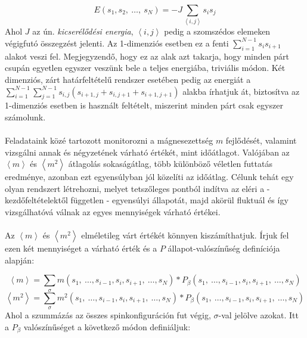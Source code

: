 \begin{equation} \label{eq:2}
    E \left( s_{1}, s_{2},\ \dots,\ s_{N} \right)
    =
    - J \sum_{\left< i,j \right>} s_{i} s_{j}
\end{equation}
Ahol $J$ az ún. \emph{kicserélődési energia}, ${\left< i,j \right>}$ pedig a szomszédos elemeken végigfutó összegzést jelenti. Az 1-dimenziós esetben ez a fenti $\sum_{i=1}^{N-1} s_{i} s_{i+1}$ alakot veszi fel. Megjegyzendő, hogy ez az alak azt takarja, hogy minden párt csupán egyetlen egyszer veszünk bele a teljes energiába, triviális módon. Két dimenziós, zárt határfeltételű rendszer esetében pedig az energiát a $\sum_{i=1}^{N-1}\sum_{j=1}^{N-1} s_{i,j} \left( s_{i+1,j} + s_{i,j+1} + s_{i+1,j+1} \right)$ alakba írhatjuk át, biztosítva az 1-dimenziós esetben is használt feltételt, miszerint minden párt csak egyszer számolunk.
\\ \\
Feladataink közé tartozott monitorozni a mágnesezettség $m$ fejlődését, valamint vizsgálni annak és négyzetének várható értékét, mint időátlagot. Valójában az $\left< m \right>$ és $\left< m^{2} \right>$ átlagolás sokaságátlag, több különböző véletlen futtatás eredménye, azonban ezt egyensúlyban jól közelíti az időátlag. Célunk tehát egy olyan rendszert létrehozni, melyet tetszőleges pontból indítva az eléri a - kezdőfeltételektől  független - egyensúlyi állapotát, majd akörül fluktuál és így vizsgálhatóvá válnak az egyes mennyiségek várható értékei.
\\ \\
Az $\left< m \right>$ és $\left< m^{2} \right>$ elméletileg várt értékét könnyen kiszámíthatjuk. Írjuk fel ezen két mennyiséget a várható érték és a $P$ állapot-valószínűség definíciója alapján:

\begin{equation} \label{eq:3}
    \left< m \right>
    =
    \sum_{\sigma} m \left( s_{1},\ \dots, s_{i-1}, s_{i} , s_{i+1},\ \dots, s_{N} \right)
    *
    P_{\beta} \left( s_{1},\ \dots, s_{i-1}, s_{i} , s_{i+1},\ \dots, s_{N} \right)
\end{equation}
\begin{equation} \label{eq:4}
    \left< m^{2} \right>
    =
    \sum_{\sigma} m^{2} \left( s_{1},\ \dots, s_{i-1}, s_{i} , s_{i+1},\ \dots, s_{N} \right)
    *
    P_{\beta} \left( s_{1},\ \dots, s_{i-1}, s_{i} , s_{i+1},\ \dots, s_{N} \right)
\end{equation}
Ahol a szummázás az összes spinkonfiguráción fut végig, $\sigma$-val jelölve azokat. Itt a $P_{\beta}$ valószínűséget a következő módon definiáljuk:

